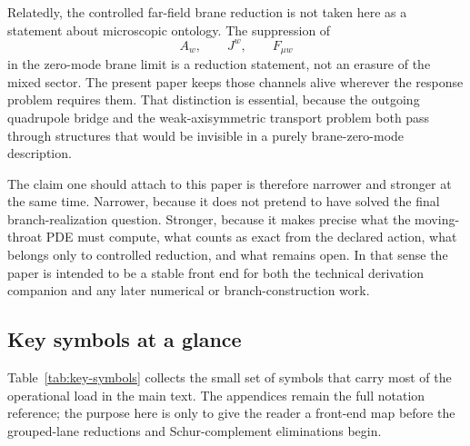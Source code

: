 \documentclass[11pt]{article}
\theoremstyle{definition}
\begin{document}
Relatedly, the controlled far-field brane reduction is not taken here as a statement about microscopic ontology. The suppression of
\[
A_w,\qquad J^w,\qquad F_{\mu w}
\]
in the zero-mode brane limit is a reduction statement, not an erasure of the mixed sector. The present paper keeps those channels alive wherever the response problem requires them. That distinction is essential, because the outgoing quadrupole bridge and the weak-axisymmetric transport problem both pass through structures that would be invisible in a purely brane-zero-mode description.

The claim one should attach to this paper is therefore narrower and stronger at the same time. Narrower, because it does not pretend to have solved the final branch-realization question. Stronger, because it makes precise what the moving-throat PDE must compute, what counts as exact from the declared action, what belongs only to controlled reduction, and what remains open. In that sense the paper is intended to be a stable front end for both the technical derivation companion and any later numerical or branch-construction work.

\subsection{Key symbols at a glance}

Table~\ref{tab:key-symbols} collects the small set of symbols that carry most of the operational load in the main text. The appendices remain the full notation reference; the purpose here is only to give the reader a front-end map before the grouped-lane reductions and Schur-complement eliminations begin.
\end{document}
